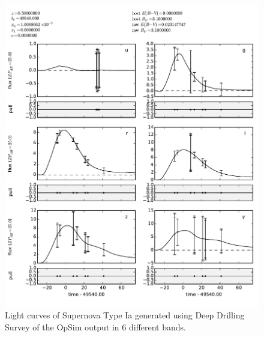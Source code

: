\begin{figure}[tbh!]
\includegraphics[angle=0,width=0.99\hsize:,clip]{figs/SN_290_lc.pdf}
\caption{Light curves of Supernova Type Ia generated using Deep Drilling Survey of the OpSim output in 6 different bands.
}
\label{fig:SNIaLCopsimdeep}
\end{figure}



